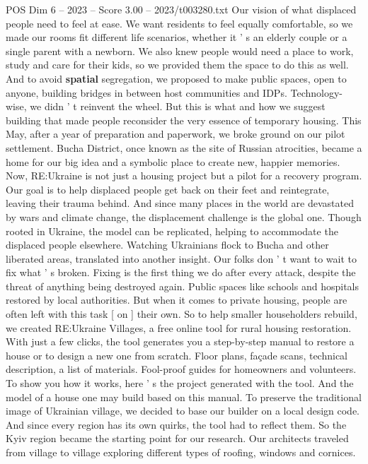 \begin{textsample}{POS Dim 6 – 2023 – Score 3.00 – 2023/t003280.txt}
Our vision of what displaced people need to feel at ease.
We want residents to feel equally comfortable, so we made our rooms fit different life scenarios, whether it ' s an elderly couple or a single parent with a newborn.
We also knew people would need a place to work, study and care for their kids, so we provided them the space to do this as well.
And to avoid \textbf{spatial} segregation, we proposed to make public spaces, open to anyone, building bridges in between host communities and IDPs.
Technology-wise, we didn ' t reinvent the wheel.
But this is what and how we suggest building that made people reconsider the very essence of temporary housing.
This May, after a year of preparation and paperwork, we broke ground on our pilot settlement.
Bucha District, once known as the site of Russian atrocities, became a home for our big idea and a symbolic place to create new, happier memories.
Now, RE:Ukraine is not just a housing project but a pilot for a recovery program.
Our goal is to help displaced people get back on their feet and reintegrate, leaving their trauma behind.
And since many places in the world are devastated by wars and climate change, the displacement challenge is the global one.
Though rooted in Ukraine, the model can be replicated, helping to accommodate the displaced people elsewhere.
Watching Ukrainians flock to Bucha and other liberated areas, translated into another insight.
Our folks don ' t want to wait to fix what ' s broken.
Fixing is the first thing we do after every attack, despite the threat of anything being destroyed again.
Public spaces like schools and hospitals restored by local authorities.
But when it comes to private housing, people are often left with this task [ on ] their own.
So to help smaller householders rebuild, we created RE:Ukraine Villages, a free online tool for rural housing restoration.
With just a few clicks, the tool generates you a step-by-step manual to restore a house or to design a new one from scratch.
Floor plans, façade scans, technical description, a list of materials.
Fool-proof guides for homeowners and volunteers.
To show you how it works, here ' s the project generated with the tool.
And the model of a house one may build based on this manual.
To preserve the traditional image of Ukrainian village, we decided to base our builder on a local design code.
And since every region has its own quirks, the tool had to reflect them.
So the Kyiv region became the starting point for our research.
Our architects traveled from village to village exploring different types of roofing, windows and cornices.

\end{textsample}

